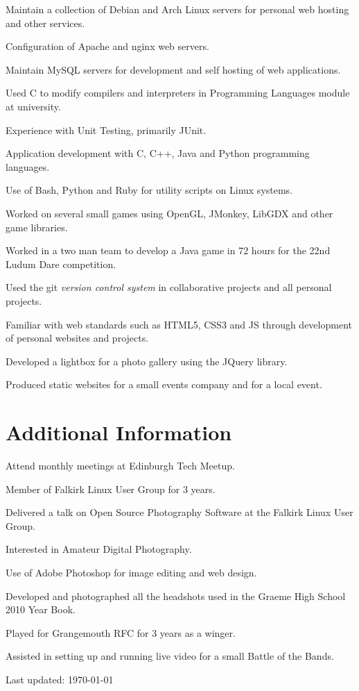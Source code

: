 \documentclass[11pt,a4paper]{article}
\renewenvironment{itemize}{
  \begin{list}{}{
    \setlength{\leftmargin}{1em}
    \setlength{\itemsep}{0.25em}
    \setlength{\parskip}{0pt}
    \setlength{\parsep}{0.25em}
    \renewcommand{\labelitemi}{$\bullet$}
  }
}{
  \end{list}
}
\begin{document}
\begin{itemize}
    \item Maintain a collection of Debian and Arch Linux servers for personal web hosting and other services.
    \item Configuration of Apache and nginx web servers.
    \item Maintain MySQL servers for development and self hosting of web applications.
    \item Used C to modify compilers and interpreters in Programming Languages module at university.
    \item Experience with Unit Testing, primarily JUnit.
    \item Application development with C, C++, Java and Python programming languages.
    \item Use of Bash, Python and Ruby for utility scripts on Linux systems.
    \item Worked on several small games using OpenGL, JMonkey, LibGDX and other game libraries.
    \item Worked in a  two man team to develop a Java game in 72 hours for the
        22nd Ludum Dare competition.
    \item Used the git \emph{version control system} in collaborative projects
        and all personal projects.
    \item Familiar with web standards such as HTML5, CSS3 and JS through development of personal websites and projects.
    \item Developed a lightbox for a photo gallery using the JQuery library.
    \item Produced static websites for a small events company and for a local event.
\end{itemize}

\section*{Additional Information}

\begin{itemize}
    \item Attend monthly meetings at Edinburgh Tech Meetup.
    \item Member of Falkirk Linux User Group for 3 years.
    \item Delivered a talk on Open Source Photography Software at the Falkirk
        Linux User Group.
    \item Interested in Amateur Digital Photography.
    \item Use of Adobe Photoshop for image editing and web design.
    \item Developed and photographed all the headshots used in the Graeme High
        School 2010 Year Book.
    \item Played for Grangemouth RFC for 3 years as a winger.
    \item Assisted in setting up and running live video for a small Battle of
        the Bands.
\end{itemize}


\medskip
\begin{center}
  \begin{small}
    Last updated: \today
  \end{small}
\end{center}
\end{document}
